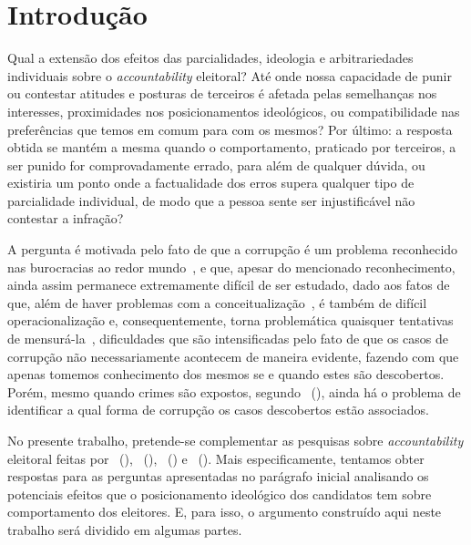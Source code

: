 \documentclass[
	12pt,				%
	openright,			%
	twoside,			%
	a4paper,			%
	openany,
	english,			%
	brazil				%
	]{abntex2}
\begin{document}
\tableofcontents*
\cleardoublepage

\textual



\chapter{Introdução}


Qual a extensão dos efeitos das parcialidades, ideologia e arbitrariedades individuais sobre o \textit{accountability} eleitoral? Até onde nossa capacidade de punir ou contestar atitudes e posturas de terceiros é afetada pelas semelhanças nos interesses, proximidades nos posicionamentos ideológicos, ou compatibilidade nas preferências que temos em comum para com os mesmos? Por último: a resposta obtida se mantém a mesma quando o comportamento, praticado por terceiros, a ser punido for comprovadamente errado, para além de qualquer dúvida, ou existiria um ponto onde a factualidade dos erros supera qualquer tipo de parcialidade individual, de modo que a pessoa sente ser injustificável não contestar a infração?

A pergunta é motivada pelo fato de que a corrupção é um problema reconhecido nas burocracias ao redor mundo~\cite{Rose-Ackerman1996Sep}, e que, apesar do mencionado reconhecimento, ainda assim permanece extremamente difícil de ser estudado, dado aos fatos de que, além de haver problemas com a conceitualização~\cite{bussell2015typologies}, é também de difícil operacionalização e, consequentemente, torna problemática quaisquer tentativas de mensurá-la~\cite{bussell2015typologies}, dificuldades que são intensificadas pelo fato de que os casos de corrupção não necessariamente acontecem de maneira evidente, fazendo com que apenas tomemos conhecimento dos mesmos se e quando estes são descobertos. Porém, mesmo quando crimes são expostos, segundo ~(\citeyear{bussell2015typologies}), ainda há o problema de identificar a qual forma de corrupção os casos descobertos estão associados.

No presente trabalho, pretende-se complementar as pesquisas sobre \textit{accountability} eleitoral feitas por ~(\citeyear{ferraz2008exposing}), ~(\citeyear{Avis2018Oct}), ~(\citeyear{Boas2019Apr}) e ~(\citeyear{Botero2021Apr}). Mais especificamente, tentamos obter respostas para as perguntas apresentadas no parágrafo inicial analisando os potenciais efeitos que o posicionamento ideológico dos candidatos tem sobre comportamento dos eleitores. E, para isso, o argumento construído aqui neste trabalho será dividido em algumas partes.
\end{document}
